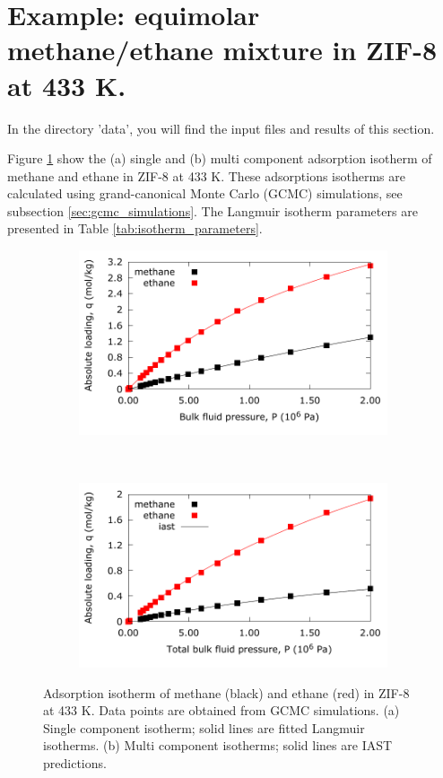 \documentclass{article}
\begin{document}
\section{Example: equimolar methane/ethane mixture in ZIF-8 at 433 K.}
In the directory 'data', you will find the input files and results of this section.

Figure \ref{fig:single_component_isotherms} show the (a) single and (b) multi component adsorption isotherm of methane and ethane in ZIF-8 at 433 K. These adsorptions isotherms are calculated using grand-canonical Monte Carlo (GCMC) simulations\cite{Dubbeldam2013}, see subsection \ref{sec:gcmc_simulations}. The Langmuir isotherm parameters are presented in Table \ref{tab:isotherm_parameters}.

\begin{figure}[h!]
\centering
\begin{subfigure}[h]{0.5\textwidth}
\centering
\includegraphics[width=1.0\textwidth]{./../data/singlecomponent_zif_methane_ethane_433K.pdf}
\subcaption{}
\end{subfigure}~
\begin{subfigure}[h]{0.5\textwidth}
\centering
\includegraphics[width=1.0\textwidth]{./../data/multicomponent_zif_methane_ethane_433K.pdf}
\subcaption{}
\end{subfigure}
\caption{Adsorption isotherm of methane (black) and ethane (red) in ZIF-8 at 433 K. Data points are obtained from GCMC simulations. (a) Single component isotherm; solid lines are fitted Langmuir isotherms. (b) Multi component isotherms; solid lines are IAST predictions.}
\label{fig:single_component_isotherms}
\end{figure}
\end{document}
